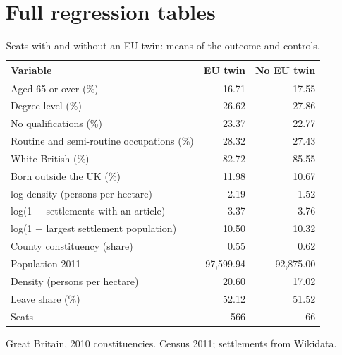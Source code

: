 \documentclass[11pt,a4paper]{article}
\begin{document}
\section{Full regression tables}\label{app:tables}
\begin{table}[H]\centering\footnotesize\begin{threeparttable}\caption{Seats with and without an EU twin: means of the outcome and controls.}\label{tab:desc}\begin{tabular}{lrr}\toprule Variable & EU twin & No EU twin\\\midrule
Aged 65 or over (\%) & 16.71 & 17.55\\
Degree level (\%) & 26.62 & 27.86\\
No qualifications (\%) & 23.37 & 22.77\\
Routine and semi-routine occupations (\%) & 28.32 & 27.43\\
White British (\%) & 82.72 & 85.55\\
Born outside the UK (\%) & 11.98 & 10.67\\
log density (persons per hectare) & 2.19 & 1.52\\
log(1 + settlements with an article) & 3.37 & 3.76\\
log(1 + largest settlement population) & 10.50 & 10.32\\
County constituency (share) & 0.55 & 0.62\\
Population 2011 & 97,599.94 & 92,875.00\\
Density (persons per hectare) & 20.60 & 17.02\\
Leave share (\%) & 52.12 & 51.52\\
Seats & 566 & 66\\
\bottomrule\end{tabular}\begin{tablenotes}\footnotesize\item Great Britain, 2010 constituencies. Census 2011; settlements from Wikidata.\end{tablenotes}\end{threeparttable}\end{table}
\end{document}

